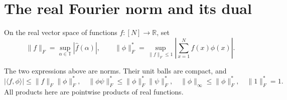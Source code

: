 \section{The real Fourier norm and its dual}

\begin{definition}
\label{app:fourier-dual-norm}
\leanok
On the real vector space of functions $f:[N]\to\mathbb R$, set
\[
 \|f\|_F=\sup_{\alpha\in\mathbb T}|\widehat f(\alpha)|,
 \qquad
 \|\phi\|_F^*=\sup_{\|f\|_F\leq1}
             \left|\sum_{x=1}^Nf(x)\phi(x)\right|.
\]
\end{definition}

\begin{lemma}
\label{app:fourier-dual-properties}
\leanok
{}
The two expressions above are norms.  Their unit balls are compact, and
\[
 |\langle f,\phi\rangle|\leq\|f\|_F\|\phi\|_F^*,\quad
 \|\phi\psi\|_F^*\leq\|\phi\|_F^*\|\psi\|_F^*,\quad
 \|\phi\|_\infty\leq\|\phi\|_F^*,\quad \|1\|_F^*=1.
\]
All products here are pointwise products of real functions.
\end{lemma}
